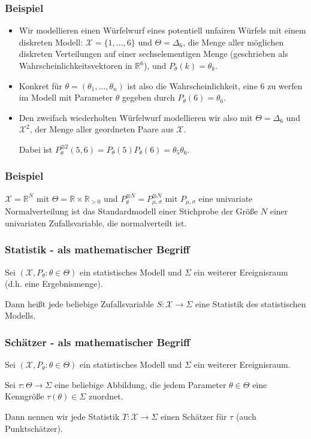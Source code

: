     \begin{frame}
      \frametitle{Beispiel}
      \begin{itemize}
        \item  Wir modellieren einen Würfelwurf eines potentiell unfairen Würfels mit einem diskreten Modell: $\mathcal{X} = \{1,\dots,6\}$ und $\Theta = \Delta_6$, die Menge aller möglichen diskreten Verteilungen auf einer sechselementigen Menge (geschrieben als Wahrscheinlichkeitsvektoren in $\mathbb{R}^6$), und $P_\theta(k) = \theta_k$.
        \item  Konkret für $\theta = (\theta_1,\dots,\theta_n)$ ist also die Wahrscheinlichkeit, eine $6$ zu werfen im Modell mit Parameter $\theta$ gegeben durch $P_\theta(6) = \theta_6$.
      \item  Den zweifach wiederholten Würfelwurf modellieren wir also mit $\Theta = \Delta_6$ und $\mathcal{X}^2$, der Menge aller geordneten Paare aus $\mathcal{X}$.

        Dabei ist $P_\theta^{\otimes 2}(5,6) = P_\theta(5)P_\theta(6) = \theta_5\theta_6$.
      \end{itemize}
    \end{frame}
  
    \begin{frame}
    \frametitle{Beispiel}
$\mathcal{X}=\mathbb{R}^N$ mit $\Theta = \mathbb{R} \times \mathbb{R}_{> 0}$ und $P_{\theta}^{\otimes N} = P_{\mu,\sigma}^{\otimes N}$ mit $P_{\mu,\sigma}$ eine univariate Normalverteilung ist das Standardmodell einer Stichprobe der Größe $N$ einer univariaten Zufallsvariable, die normalverteilt ist.
\end{frame}

    \begin{frame}
    \frametitle{Statistik - als mathematischer Begriff}
\begin{definition}
  Sei $(\mathcal{X}, P_\theta : \theta \in \Theta)$ ein statistisches Modell und $\Sigma$ ein weiterer Ereignisraum (d.h. eine Ergebnismenge).

  Dann heißt jede beliebige Zufallsvariable $S \colon \mathcal{X} \to \Sigma$ eine \alert{Statistik} des statistischen Modells.
\end{definition}
\end{frame}


    \begin{frame}
    \frametitle{Schätzer - als mathematischer Begriff}
\begin{definition}
  Sei $(\mathcal{X}, P_\theta : \theta \in \Theta)$ ein statistisches Modell und $\Sigma$ ein weiterer Ereignisraum.
  
  Sei $\tau \colon \Theta \to \Sigma$ eine beliebige Abbildung, die jedem Parameter $\theta \in \Theta$ eine Kenngröße $\tau(\theta) \in \Sigma$ zuordnet.
  
Dann nennen wir jede Statistik $T \colon \mathcal{X} \to \Sigma$ einen \alert{Schätzer} für $\tau$  (auch \alert{Punktschätzer}).
\end{definition}
\end{frame}

